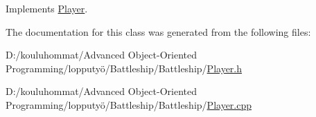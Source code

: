 Implements \mbox{\hyperlink{class_player_a368527cfefaac58dc942b32658f977ed}{Player}}.



The documentation for this class was generated from the following files\+:\begin{DoxyCompactItemize}
\item 
D\+:/kouluhommat/\+Advanced Object-\/\+Oriented Programming/lopputyö/\+Battleship/\+Battleship/\mbox{\hyperlink{_player_8h}{Player.\+h}}\item 
D\+:/kouluhommat/\+Advanced Object-\/\+Oriented Programming/lopputyö/\+Battleship/\+Battleship/\mbox{\hyperlink{_player_8cpp}{Player.\+cpp}}\end{DoxyCompactItemize}
